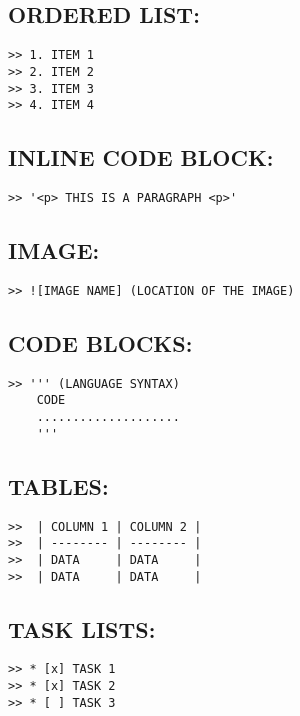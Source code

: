 \documentclass[10pt]{article}
\begin{document}
\subsection{ORDERED LIST:}
\begin{verbatim}
>> 1. ITEM 1
>> 2. ITEM 2
>> 3. ITEM 3
>> 4. ITEM 4
\end{verbatim}

\subsection{INLINE CODE BLOCK:}
\begin{verbatim}
>> '<p> THIS IS A PARAGRAPH <p>'
\end{verbatim}

\subsection{IMAGE:}
\begin{verbatim}
>> ![IMAGE NAME] (LOCATION OF THE IMAGE)
\end{verbatim}

\subsection{CODE BLOCKS:}
\begin{verbatim}
>> ''' (LANGUAGE SYNTAX)
	CODE 
	....................
	'''
\end{verbatim}

\subsection{TABLES:}
\begin{verbatim}
>>  | COLUMN 1 | COLUMN 2 |
>>  | -------- | -------- |
>>  | DATA     | DATA     |
>>  | DATA     | DATA     |
\end{verbatim}

\subsection{TASK LISTS:}
\begin{verbatim}
>> * [x] TASK 1
>> * [x] TASK 2
>> * [ ] TASK 3
\end{verbatim}
\end{document}
